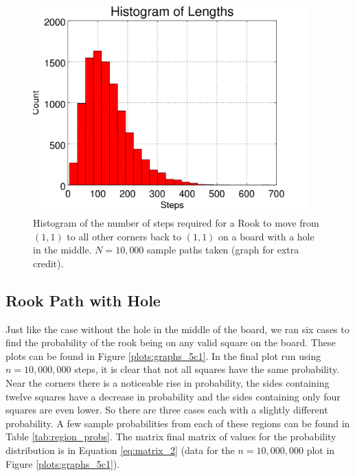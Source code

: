 \documentclass{amsart}
\numberwithin{equation}{section}
\begin{document}
\begin{figure}
    \centering
    \includegraphics[width=0.95\textwidth]{figures/extraCredit/withHole_N10000.png}
    \caption{Histogram of the number of steps required for a Rook to move from $(1,1)$ to all other corners back to $(1,1)$ on a board with a hole in the middle. $N=10,000$ sample paths taken (graph for extra credit).}
    \label{fig:extra_withHole}
\end{figure}

\subsection{Rook Path with Hole}
Just like the case without the hole in the middle of the board, we ran six cases to find the probability of the rook being on any valid square on the board. These plots can be found in Figure \ref{plots:graphs_5c1}. In the final plot run using $n=10,000,000$ steps, it is clear that not all squares have the same probability. Near the corners there is a noticeable rise in probability, the sides containing twelve squares have a decrease in probability and the sides containing only four squares are even lower. So there are three cases each with a slightly different probability. A few sample probabilities from each of these regions can be found in Table \ref{tab:region_probs}. The matrix final matrix of values for the probability distribution is in Equation \ref{eq:matrix_2} (data for the $n=10,000,000$ plot in Figure \ref{plots:graphs_5c1}).
\end{document}
